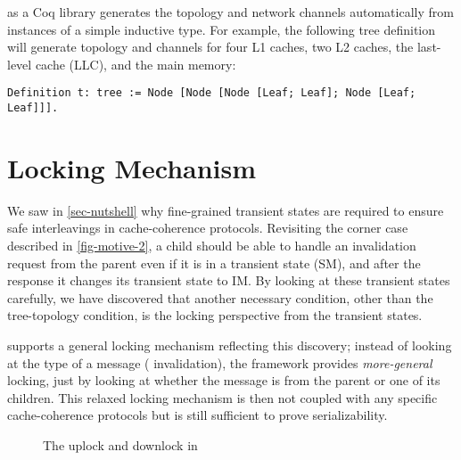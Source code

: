 \hemiola{} as a Coq library generates the topology and network channels automatically from instances of a simple inductive type.
For example, the following tree definition will generate topology and channels for four L1 caches, two L2 caches, the last-level cache (LLC), and the main memory:
\begin{lstlisting}[numbers=none, frame=none]
  Definition t: tree := Node [Node [Node [Leaf; Leaf]; Node [Leaf; Leaf]]].
\end{lstlisting}

\section{Locking Mechanism}
\label{sec-locking-mechanism}

We saw in \autoref{sec-nutshell} why fine-grained transient states are required to ensure safe interleavings in cache-coherence protocols.
Revisiting the corner case described in \autoref{fig-motive-2}, a child should be able to handle an invalidation request from the parent even if it is in a transient state (SM), and after the response it changes its transient state to IM.
By looking at these transient states carefully, we have discovered that another necessary condition, other than the tree-topology condition, is the locking perspective from the transient states.

\hemiola{} supports a general locking mechanism reflecting this discovery;
instead of looking at the type of a message (\eg{} invalidation), the framework provides \emph{more-general} locking, just by looking at whether the message is from the parent or one of its children.
This relaxed locking mechanism is then not coupled with any specific cache-coherence protocols but is still sufficient to prove serializability.

\begin{figure}[h]
  \centering
  \caption{The uplock and downlock in \hemiola{}}
  \label{fig-locking}
\end{figure}

